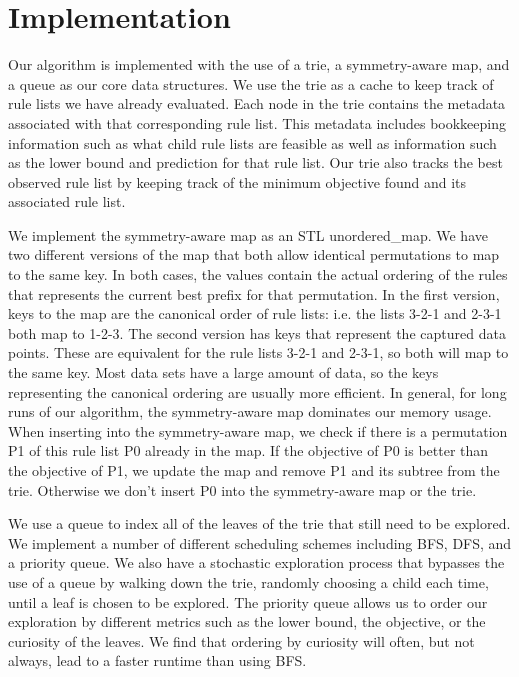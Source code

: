 \section{Implementation}

Our algorithm is implemented with the use of a trie, a symmetry-aware map, and a queue as our core data structures. We use the trie as a cache to keep track of rule lists we have already evaluated. Each node in the trie contains the metadata associated with that corresponding rule list. This metadata includes bookkeeping information such as what child rule lists are feasible as well as information such as the lower bound and prediction for that rule list. Our trie also tracks the best observed rule list by keeping track of the minimum objective found and its associated rule list.

We implement the symmetry-aware map as an STL unordered\_map. We have two different versions of the map that both allow identical permutations to map to the same key. In both cases, the values contain the actual ordering of the rules that represents the current best prefix for that permutation. In the first version, keys to the map are the canonical order of rule lists: i.e. the lists 3-2-1 and 2-3-1 both map to 1-2-3. The second version has keys that represent the captured data points. These are equivalent for the rule lists 3-2-1 and 2-3-1, so both will map to the same key. Most data sets have a large amount of data, so the keys representing the canonical ordering are usually more efficient. In general, for long runs of our algorithm, the symmetry-aware map dominates our memory usage. When inserting into the symmetry-aware map, we check if there is a permutation P1 of this rule list P0 already in the map. If the objective of P0 is better than the objective of P1, we update the map and remove P1 and its subtree from the trie. Otherwise we don't insert P0 into the symmetry-aware map or the trie.

We use a queue to index all of the leaves of the trie that still need to be explored. We implement a number of different scheduling schemes including BFS, DFS, and a priority queue. We also have a stochastic exploration process that bypasses the use of a queue by walking down the trie, randomly choosing a child each time, until a leaf is chosen to be explored. The priority queue allows us to order our exploration by different metrics such as the lower bound, the objective, or the curiosity of the leaves. We find that ordering by curiosity will often, but not always, lead to a faster runtime than using BFS.

